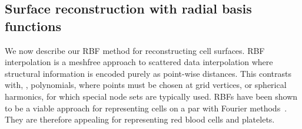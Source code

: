 \subsection{Surface reconstruction with radial basis functions}\label{sec:rbf-interpolation}

We now describe our RBF method for reconstructing cell surfaces. RBF interpolation is a meshfree approach to
scattered data interpolation where structural information is encoded purely as point-wise distances. This
contrasts with, , polynomials, where points must be chosen at grid vertices, or spherical harmonics,
for which special node sets are typically used. RBFs have been shown to be a viable approach for representing
cells on a par with Fourier methods~\cite{Shankar:2013ki}. They are therefore appealing for representing red blood
cells and platelets.


